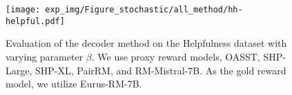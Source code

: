 \begin{figure}[htbp]
    \centering
    \texttt{[image: exp\_img/Figure\_stochastic/all\_method/hh-helpful.pdf]}
    \caption{
    Evaluation of the decoder method on the Helpfulness dataset with varying parameter $\beta$. We use proxy reward models, OASST, SHP-Large, SHP-XL,  PairRM, and RM-Mistral-7B. As the gold reward model, we utilize Eurus-RM-7B.
    }
    \label{fig:score-he}
\end{figure}


